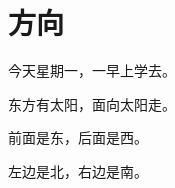 \documentclass[12pt,UTF-8,openany]{ctexbook}
\begin{document}
\hanzibox{}\hanzibox{}\hanzibox{}\hanzibox{}\hspace{1em}\hanzibox{}\hanzibox{}\hanzibox{}\hanzibox{}

\hanzibox{}\hanzibox{}\hanzibox{}\hanzibox{}\hspace{1em}\hanzibox{}\hanzibox{}\hanzibox{}\hanzibox{}

\hanzibox{}\hanzibox{}\hanzibox{}\hanzibox{}\hspace{1em}\hanzibox{}\hanzibox{}\hanzibox{}\hanzibox{}

\hanzibox{}\hanzibox{}\hanzibox{}\hanzibox{}\hspace{1em}




\chapter{方向}

\begin{large}
    
    今天星期一，一早上学去。
    
    东方有太阳，面向太阳走。
    
    前面是东，后面是西。
    
    左边是北，右边是南。
    
\end{large}


\clearpage

\begin{center}
    
    
\end{center}


\hanzibox{}\hanzibox{}\hanzibox{}\hanzibox{}\hspace{1em}\hanzibox{}\hanzibox{}\hanzibox{}\hanzibox{}

\hanzibox{}\hanzibox{}\hanzibox{}\hanzibox{}\hspace{1em}\hanzibox{}\hanzibox{}\hanzibox{}\hanzibox{}

\hanzibox{}\hanzibox{}\hanzibox{}\hanzibox{}\hspace{1em}\hanzibox{}\hanzibox{}\hanzibox{}\hanzibox{}

\hanzibox{}\hanzibox{}\hanzibox{}\hanzibox{}\hspace{1em}\hanzibox{}\hanzibox{}\hanzibox{}\hanzibox{}
\end{document}
